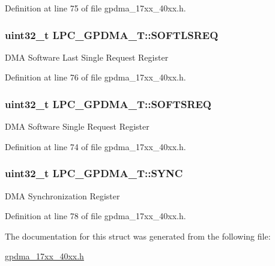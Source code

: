 Definition at line 75 of file gpdma\+\_\+17xx\+\_\+40xx.\+h.

\subsubsection[{\texorpdfstring{S\+O\+F\+T\+L\+S\+R\+EQ}{SOFTLSREQ}}]{ uint32\+\_\+t L\+P\+C\+\_\+\+G\+P\+D\+M\+A\+\_\+\+T\+::\+S\+O\+F\+T\+L\+S\+R\+EQ}\hypertarget{structLPC__GPDMA__T_a0b7a85e9f40e19d368c8358ca48778de}{}\label{structLPC__GPDMA__T_a0b7a85e9f40e19d368c8358ca48778de}
D\+MA Software Last Single Request Register 

Definition at line 76 of file gpdma\+\_\+17xx\+\_\+40xx.\+h.

\subsubsection[{\texorpdfstring{S\+O\+F\+T\+S\+R\+EQ}{SOFTSREQ}}]{ uint32\+\_\+t L\+P\+C\+\_\+\+G\+P\+D\+M\+A\+\_\+\+T\+::\+S\+O\+F\+T\+S\+R\+EQ}\hypertarget{structLPC__GPDMA__T_a2905a8988cfd38c6e44d121783c0bfe7}{}\label{structLPC__GPDMA__T_a2905a8988cfd38c6e44d121783c0bfe7}
D\+MA Software Single Request Register 

Definition at line 74 of file gpdma\+\_\+17xx\+\_\+40xx.\+h.

\subsubsection[{\texorpdfstring{S\+Y\+NC}{SYNC}}]{ uint32\+\_\+t L\+P\+C\+\_\+\+G\+P\+D\+M\+A\+\_\+\+T\+::\+S\+Y\+NC}\hypertarget{structLPC__GPDMA__T_ac89c20888b14781ead9fe459f8f79853}{}\label{structLPC__GPDMA__T_ac89c20888b14781ead9fe459f8f79853}
D\+MA Synchronization Register 

Definition at line 78 of file gpdma\+\_\+17xx\+\_\+40xx.\+h.



The documentation for this struct was generated from the following file\+:\begin{DoxyCompactItemize}
\item 
\hyperlink{gpdma__17xx__40xx_8h}{gpdma\+\_\+17xx\+\_\+40xx.\+h}\end{DoxyCompactItemize}
